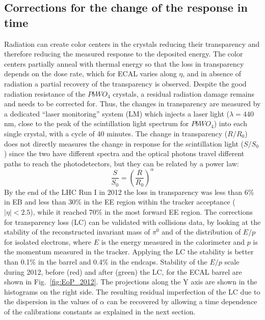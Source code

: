 \documentclass[journal]{IEEEtran}
\begin{document}
\subsection{Corrections for the change of the response in time}
Radiation can create color centers in the crystals reducing their transparency and therefore reducing the measured response to the deposited energy. The color centers partially anneal with thermal energy so that the loss in transparency depends on the dose rate, which for ECAL varies along $\eta$, and in absence of radiation a partial recovery of the transparency is observed.
Despite the good radiation resistance of the $PbWO_4$ crystals, a residual radiation damage remains and needs to be corrected for. Thus, the changes in transparency are measured by a dedicated ``laser monitoring'' system \cite{Anfreville:2007zz} (LM) which injects a laser light ($\lambda=440$ nm, close to the peak of the scintillation light spectrum for $PbWO_4$) into each single crystal, with a cycle of 40 minutes. The change in transparency ($R/R_0$) does not directly measures the change in response for the scintillation light ($S/S_0$) since the two have different spectra and the optical photons travel different paths to reach the photodetectors, but they can be related by a power law:
\begin{equation}
\frac{S}{S_0} = \left(\frac{R}{R_0}\right)^\alpha
\end{equation}
By the end of the LHC Run I in 2012 the loss in transparency was less than 6\% in EB and less than 30\% in the EE region within the tracker acceptance ($\vert\eta\vert<2.5$), while it reached 70\% in the most forward EE region. The corrections for transparency loss (LC) can be validated with collisions data, by looking at the stability of the reconstructed invariant mass of $\pi^0$ and of the distribution of $E/p$ for isolated electrons, where $E$ is the energy measured in the calorimeter and $p$ is the momentum measured in the tracker. Applying the LC the stability is better than 0.1\% in the barrel and 0.4\% in the endcaps.  Stability of the $E/p$ scale during 2012, before (red) and after (green) the LC, for the ECAL barrel are shown in Fig.~\ref{fig:EoP_2012}. The projections along the Y axis are shown in the histograms on the right side.
 The resulting residual imperfection of the LC due to the dispersion in the values of $\alpha$ can be recovered by allowing a time dependence of the calibrations constants as explained in the next section. 
%
\end{document}
